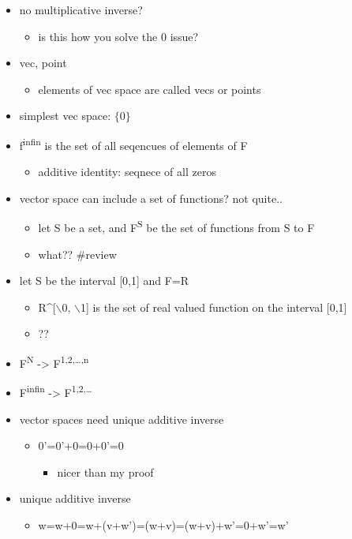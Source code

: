 \documentclass[letterpaper]{article}
\begin{document}
\begin{itemize}
\item no multiplicative inverse?

\begin{itemize}
\item is this how you solve the 0 issue?
\end{itemize}

\item vec, point

\begin{itemize}
\item elements of vec space are called vecs or points
\end{itemize}

\item simplest vec space: \(\{0\}\)
\item f\textsuperscript{infin} is the set of all seqencues of elements of F

\begin{itemize}
\item additive identity: seqnece of all zeros
\end{itemize}

\item vector space can include a set of functions? not quite..

\begin{itemize}
\item let S be a set, and F\textsuperscript{S} be the set of functions from S to F
\item what?? \#review
\end{itemize}

\item let S be the interval [0,1] and F=R

\begin{itemize}
\item R\^{}[$\backslash$0, $\backslash$1] is the set of real valued function on the interval [0,1]
\item ??
\end{itemize}

\item F\textsuperscript{N} -> F\textsuperscript{1,2,\ldots{},n}
\item F\textsuperscript{infin} -> F\textsuperscript{1,2,\ldots{}}
\item vector spaces need unique additive inverse

\begin{itemize}
\item 0'=0'+0=0+0'=0

\begin{itemize}
\item nicer than my proof
\end{itemize}
\end{itemize}

\item unique additive inverse

\begin{itemize}
\item w=w+0=w+(v+w')=(w+v)=(w+v)+w'=0+w'=w'
\end{itemize}
\end{itemize}
\end{document}
